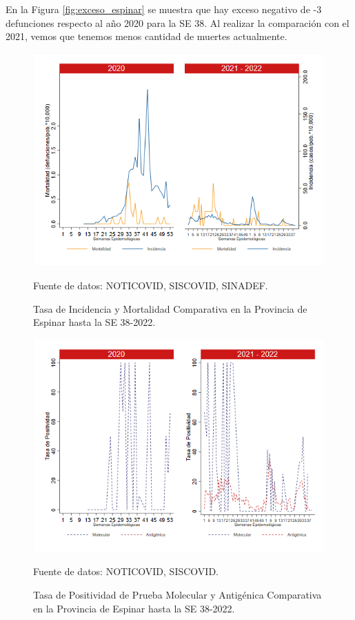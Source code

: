 \documentclass[12pt,a4paper,openany]{book}
\begin{document}
	En la Figura \ref{fig:exceso_espinar} se muestra que hay exceso negativo de -3 defunciones respecto al año 2020 para la SE 38. Al realizar la comparación con el 2021, vemos que tenemos menos cantidad de muertes actualmente.
	
	\begin{figure}[h]
		\caption{Tasa de Incidencia y Mortalidad Comparativa en la Provincia de Espinar hasta la SE 38-2022.}\label{fig:inc_mort_espinar}
		\begin{center}
			\includegraphics[width=0.85\linewidth]{../figuras/incidencia_mortalidad_20_21_8.png}
		\end{center}
		{\footnotesize {Fuente de datos: NOTICOVID, SISCOVID, SINADEF.}}
	\end{figure}
	
	\begin{figure}[h]
		\caption{Tasa de Positividad de Prueba Molecular y Antigénica Comparativa en la Provincia de Espinar hasta la SE 38-2022.}\label{fig:positividad_espinar}
		\begin{center}
			\includegraphics[width=0.7\linewidth]{../figuras/positividad_20_21_8.png}
		\end{center}
		{\footnotesize {Fuente de datos: NOTICOVID, SISCOVID.}}
	\end{figure}
	
\end{document}
